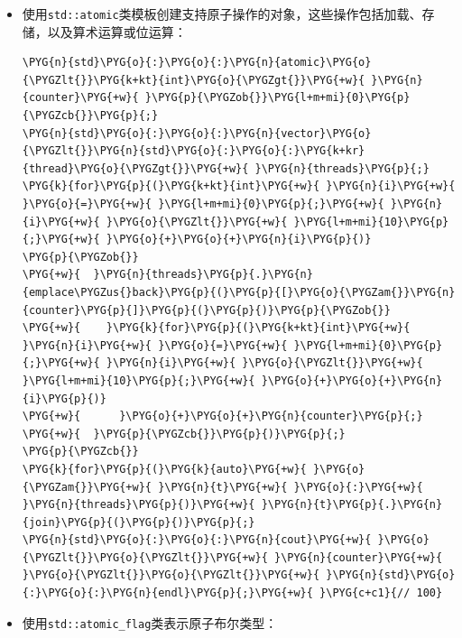 \begin{itemize}
\item 使用\texttt{std::\allowbreak{}atomic}类模板创建支持原子操作的对象，这些操作包括加载、存储，以及算术运算或位运算：



\begin{codeblockbg}
\begin{Verbatim}[commandchars=\\\{\},breaklines=true,breakanywhere=true,fontsize=\codefont,xleftmargin=17bp]
\PYG{n}{std}\PYG{o}{:}\PYG{o}{:}\PYG{n}{atomic}\PYG{o}{\PYGZlt{}}\PYG{k+kt}{int}\PYG{o}{\PYGZgt{}}\PYG{+w}{ }\PYG{n}{counter}\PYG{+w}{ }\PYG{p}{\PYGZob{}}\PYG{l+m+mi}{0}\PYG{p}{\PYGZcb{}}\PYG{p}{;}
\PYG{n}{std}\PYG{o}{:}\PYG{o}{:}\PYG{n}{vector}\PYG{o}{\PYGZlt{}}\PYG{n}{std}\PYG{o}{:}\PYG{o}{:}\PYG{k+kr}{thread}\PYG{o}{\PYGZgt{}}\PYG{+w}{ }\PYG{n}{threads}\PYG{p}{;}
\PYG{k}{for}\PYG{p}{(}\PYG{k+kt}{int}\PYG{+w}{ }\PYG{n}{i}\PYG{+w}{ }\PYG{o}{=}\PYG{+w}{ }\PYG{l+m+mi}{0}\PYG{p}{;}\PYG{+w}{ }\PYG{n}{i}\PYG{+w}{ }\PYG{o}{\PYGZlt{}}\PYG{+w}{ }\PYG{l+m+mi}{10}\PYG{p}{;}\PYG{+w}{ }\PYG{o}{+}\PYG{o}{+}\PYG{n}{i}\PYG{p}{)}
\PYG{p}{\PYGZob{}}
\PYG{+w}{  }\PYG{n}{threads}\PYG{p}{.}\PYG{n}{emplace\PYGZus{}back}\PYG{p}{(}\PYG{p}{[}\PYG{o}{\PYGZam{}}\PYG{n}{counter}\PYG{p}{]}\PYG{p}{(}\PYG{p}{)}\PYG{p}{\PYGZob{}}
\PYG{+w}{    }\PYG{k}{for}\PYG{p}{(}\PYG{k+kt}{int}\PYG{+w}{ }\PYG{n}{i}\PYG{+w}{ }\PYG{o}{=}\PYG{+w}{ }\PYG{l+m+mi}{0}\PYG{p}{;}\PYG{+w}{ }\PYG{n}{i}\PYG{+w}{ }\PYG{o}{\PYGZlt{}}\PYG{+w}{ }\PYG{l+m+mi}{10}\PYG{p}{;}\PYG{+w}{ }\PYG{o}{+}\PYG{o}{+}\PYG{n}{i}\PYG{p}{)}
\PYG{+w}{      }\PYG{o}{+}\PYG{o}{+}\PYG{n}{counter}\PYG{p}{;}
\PYG{+w}{  }\PYG{p}{\PYGZcb{}}\PYG{p}{)}\PYG{p}{;}
\PYG{p}{\PYGZcb{}}
\PYG{k}{for}\PYG{p}{(}\PYG{k}{auto}\PYG{+w}{ }\PYG{o}{\PYGZam{}}\PYG{+w}{ }\PYG{n}{t}\PYG{+w}{ }\PYG{o}{:}\PYG{+w}{ }\PYG{n}{threads}\PYG{p}{)}\PYG{+w}{ }\PYG{n}{t}\PYG{p}{.}\PYG{n}{join}\PYG{p}{(}\PYG{p}{)}\PYG{p}{;}
\PYG{n}{std}\PYG{o}{:}\PYG{o}{:}\PYG{n}{cout}\PYG{+w}{ }\PYG{o}{\PYGZlt{}}\PYG{o}{\PYGZlt{}}\PYG{+w}{ }\PYG{n}{counter}\PYG{+w}{ }\PYG{o}{\PYGZlt{}}\PYG{o}{\PYGZlt{}}\PYG{+w}{ }\PYG{n}{std}\PYG{o}{:}\PYG{o}{:}\PYG{n}{endl}\PYG{p}{;}\PYG{+w}{ }\PYG{c+c1}{// 100}
\end{Verbatim}
\end{codeblockbg}



\item 使用\texttt{std::\allowbreak{}atomic\_\allowbreak{}flag}类表示原子布尔类型：



\end{itemize}
